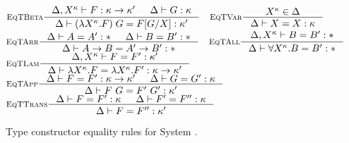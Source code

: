 \begin{figure}
\noindent
$\inference[\sc EqTBeta]
        {\Delta,X^\kappa |- F : \kappa -> \kappa' & \Delta |- G : \kappa}
        {\Delta |- (\l X^\kappa.F)\;G = F[G/X] : \kappa'} \quad
  \inference[\sc EqTVar]{X^\kappa \in \Delta}{\Delta |- X = X : \kappa} $
\vspace*{.7em} \\
$ \inference[\sc EqTArr]{\Delta |- A=A':* & \Delta |- B=B':*}
                        {\Delta |- A -> B=A' -> B':*} \quad
  \inference[\sc EqTAll]{\Delta,X^\kappa |- B=B':*}
                        {\Delta |- \forall X^\kappa.B=B':*} $
\vspace*{.7em} \\
$\inference[\sc EqTLam]
        {\Delta,X^\kappa |- F=F':\kappa'}
        {\Delta |- \l X^\kappa.F=\l X^\kappa.F':\kappa -> \kappa'} $
\vspace*{.7em} \\
$\inference[\sc EqTApp]
        {\Delta |- F=F' : \kappa -> \kappa' & \Delta |- G=G' : \kappa}
        {\Delta |- F ~ G = F' ~ G' : \kappa'} $
\vspace*{.7em} \\
$\inference[\sc EqTTrans]
        {\Delta |- F=F' : \kappa & \Delta |- F'=F'' : \kappa}
        {\Delta |- F=F'' : \kappa'} $
\caption{Type constructor equality rules for System \Fw.}
\label{fig:eqtyfw}
\end{figure}

